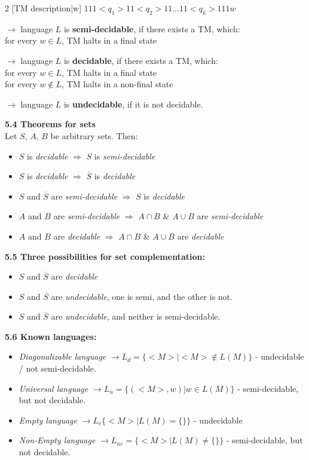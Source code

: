 \documentclass{article}
\begin{document}
\begin{multicols}{2}
	[TM description$|$w]
	$111<q_1>11<q_2>11\dots11<q_k>111w$ \smallskip

	$\rightarrow$ language $L$ is \textbf{semi-decidable}, if there exists a TM, which:\\
	for every $w \in L$, TM halts in a final state

	$\rightarrow$ language $L$ is \textbf{decidable}, if there exists a TM, which:\\
	for every $w \in L$, TM halts in a final state\\
	for every $w \notin L$, TM halts in a non-final state


	$\rightarrow$ language $L$ is \textbf{undecidable}, if it is not decidable.

	\textbf{5.4 Theorems for sets}\\
	Let $S$, $A$, $B$ be arbitrary sets. Then:
	\begin{itemize}
		\setlength\itemsep{-0.4em}
		\item $S$ is \textit{decidable} $\Rightarrow$ $S$ is \textit{semi-decidable}
		\item $S$ is \textit{decidable} $\Rightarrow$ $\overline{S}$ is \textit{decidable}
		\item $S$ and $\overline{S}$ are \textit{semi-decidable} $\Rightarrow$ $S$ is \textit{decidable}
		\item $A$ and $B$ are \textit{semi-decidable} $\Rightarrow$ $A \cap B $ $\&$ $A \cup B$ are \textit{semi-decidable}
		\item $A$ and $B$ are \textit{decidable} $\Rightarrow$ $A \cap B $ $\&$ $A \cup B$ are \textit{decidable}
	\end{itemize}

	\textbf{5.5 Three possibilities for set complementation:}
	\begin{itemize}
		\setlength\itemsep{-0.2em}
		\item $S$ and $\overline{S}$ are \textit{decidable}
		\item $S$ and $\overline{S}$ are \textit{undecidable}, one is semi, and the other is not.
		\item $S$ and $\overline{S}$ are \textit{undecidable}, and neither is semi-decidable.
	\end{itemize}

	\textbf{5.6 Known languages:}\\
	\begin{itemize}
		\setlength\itemsep{-0.2em}
		\item \textit{Diagonalizable language} $\rightarrow L_d = \{<M >| <M> \notin L(M)\}$ - undecidable / not semi-decidable.
		\item \textit{Universal language} $\rightarrow L_u = \{(<M>, w) | w \in L(M)\}$ - semi-decidable, but not decidable.
		\item \textit{Empty language} $\rightarrow L_e \{<M> | L(M) = \{\}\}$ - undecidable
		\item \textit{Non-Empty language} $\rightarrow L_{ne} = \{<M> | L(M) \neq \{\}\}$ - semi-decidable, but not decidable.
	\end{itemize}


\end{multicols}
\end{document}
